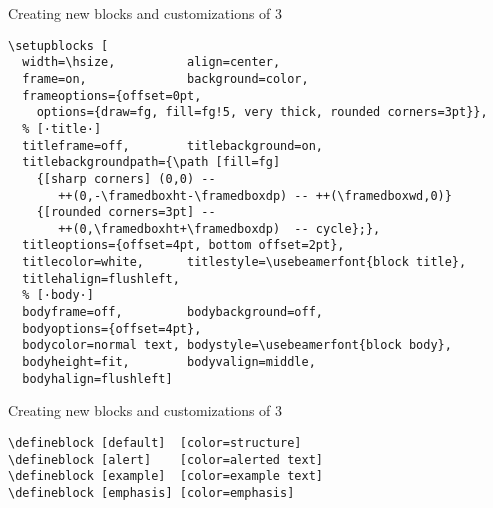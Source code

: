 \documentclass[9pt]{beamer}
\begin{document}
\begin{frame}[fragile]
  {Creating new blocks and customizations  of 3}

\begin{verbatim}
\setupblocks [
  width=\hsize,          align=center,
  frame=on,              background=color,
  frameoptions={offset=0pt,
    options={draw=fg, fill=fg!5, very thick, rounded corners=3pt}},
  % [·title·]
  titleframe=off,        titlebackground=on,
  titlebackgroundpath={\path [fill=fg]
    {[sharp corners] (0,0) --
       ++(0,-\framedboxht-\framedboxdp) -- ++(\framedboxwd,0)}
    {[rounded corners=3pt] --
       ++(0,\framedboxht+\framedboxdp)  -- cycle};},
  titleoptions={offset=4pt, bottom offset=2pt},
  titlecolor=white,      titlestyle=\usebeamerfont{block title},
  titlehalign=flushleft,
  % [·body·]
  bodyframe=off,         bodybackground=off,
  bodyoptions={offset=4pt},
  bodycolor=normal text, bodystyle=\usebeamerfont{block body},
  bodyheight=fit,        bodyvalign=middle,
  bodyhalign=flushleft]
\end{verbatim}

\end{frame}

\begin{frame}[fragile]
  {Creating new blocks and customizations  of 3}

\begin{verbatim}
\defineblock [default]  [color=structure]
\defineblock [alert]    [color=alerted text]
\defineblock [example]  [color=example text]
\defineblock [emphasis] [color=emphasis]
\end{verbatim}

\end{frame}
\end{document}
